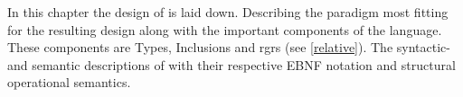 In this chapter the design of \langname{} is laid down. Describing the paradigm most fitting for the resulting design along with the important components of the language. These components are Types, Inclusions and \ac{rgrs} (see \ref{relative}). The syntactic- and semantic descriptions of \langname{} with their respective EBNF notation and structural operational semantics.
